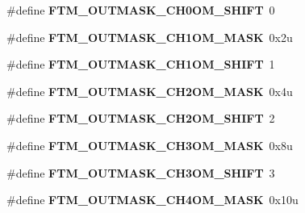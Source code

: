 \begin{DoxyCompactItemize}
\item 
\#define {\bfseries F\+T\+M\+\_\+\+O\+U\+T\+M\+A\+S\+K\+\_\+\+C\+H0\+O\+M\+\_\+\+S\+H\+I\+FT}~0\hypertarget{group__FTM__Register__Masks_gaae1f8ee6cad97accdeef238387cd160c}{}\label{group__FTM__Register__Masks_gaae1f8ee6cad97accdeef238387cd160c}

\item 
\#define {\bfseries F\+T\+M\+\_\+\+O\+U\+T\+M\+A\+S\+K\+\_\+\+C\+H1\+O\+M\+\_\+\+M\+A\+SK}~0x2u\hypertarget{group__FTM__Register__Masks_gaddee400c7d6e8dca5d318526d6e9cf0c}{}\label{group__FTM__Register__Masks_gaddee400c7d6e8dca5d318526d6e9cf0c}

\item 
\#define {\bfseries F\+T\+M\+\_\+\+O\+U\+T\+M\+A\+S\+K\+\_\+\+C\+H1\+O\+M\+\_\+\+S\+H\+I\+FT}~1\hypertarget{group__FTM__Register__Masks_ga50e5211e18cdbae9c986b49e5ff919f8}{}\label{group__FTM__Register__Masks_ga50e5211e18cdbae9c986b49e5ff919f8}

\item 
\#define {\bfseries F\+T\+M\+\_\+\+O\+U\+T\+M\+A\+S\+K\+\_\+\+C\+H2\+O\+M\+\_\+\+M\+A\+SK}~0x4u\hypertarget{group__FTM__Register__Masks_gabcfafbb8acba84e561a6023f966991c8}{}\label{group__FTM__Register__Masks_gabcfafbb8acba84e561a6023f966991c8}

\item 
\#define {\bfseries F\+T\+M\+\_\+\+O\+U\+T\+M\+A\+S\+K\+\_\+\+C\+H2\+O\+M\+\_\+\+S\+H\+I\+FT}~2\hypertarget{group__FTM__Register__Masks_ga9dca78158dd0cbc591569935f052bab4}{}\label{group__FTM__Register__Masks_ga9dca78158dd0cbc591569935f052bab4}

\item 
\#define {\bfseries F\+T\+M\+\_\+\+O\+U\+T\+M\+A\+S\+K\+\_\+\+C\+H3\+O\+M\+\_\+\+M\+A\+SK}~0x8u\hypertarget{group__FTM__Register__Masks_gae6021cca5706f19ca601ca8d020c4903}{}\label{group__FTM__Register__Masks_gae6021cca5706f19ca601ca8d020c4903}

\item 
\#define {\bfseries F\+T\+M\+\_\+\+O\+U\+T\+M\+A\+S\+K\+\_\+\+C\+H3\+O\+M\+\_\+\+S\+H\+I\+FT}~3\hypertarget{group__FTM__Register__Masks_gaeb20c19e85755256c8336c06d5602852}{}\label{group__FTM__Register__Masks_gaeb20c19e85755256c8336c06d5602852}

\item 
\#define {\bfseries F\+T\+M\+\_\+\+O\+U\+T\+M\+A\+S\+K\+\_\+\+C\+H4\+O\+M\+\_\+\+M\+A\+SK}~0x10u\hypertarget{group__FTM__Register__Masks_ga89efa7258ffb29d1477ca5d7dc9ae870}{}\label{group__FTM__Register__Masks_ga89efa7258ffb29d1477ca5d7dc9ae870}


\end{DoxyCompactItemize}
